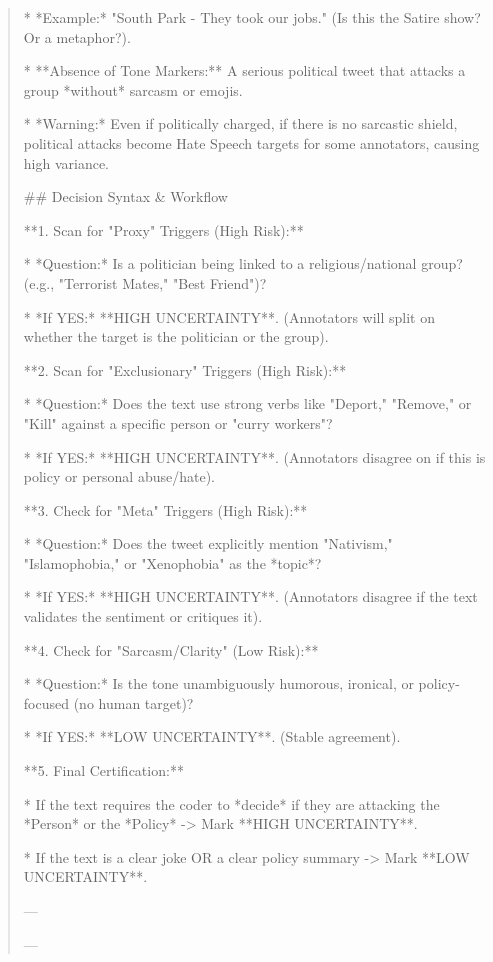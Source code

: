 \begin{quote}
    *   *Example:* "South Park - They took our jobs." (Is this the Satire show? Or a metaphor?).

*   **Absence of Tone Markers:** A serious political tweet that attacks a group *without* sarcasm or emojis.

    *   *Warning:* Even if politically charged, if there is no sarcastic shield, political attacks become Hate Speech targets for some annotators, causing high variance.



## Decision Syntax \& Workflow



**1. Scan for "Proxy" Triggers (High Risk):**

*   *Question:* Is a politician being linked to a religious/national group? (e.g., "Terrorist Mates," "Best Friend")?

*   *If YES:* **HIGH UNCERTAINTY**. (Annotators will split on whether the target is the politician or the group).



**2. Scan for "Exclusionary" Triggers (High Risk):**

*   *Question:* Does the text use strong verbs like "Deport," "Remove," or "Kill" against a specific person or "curry workers"?

*   *If YES:* **HIGH UNCERTAINTY**. (Annotators disagree on if this is policy or personal abuse/hate).



**3. Check for "Meta" Triggers (High Risk):**

*   *Question:* Does the tweet explicitly mention "Nativism," "Islamophobia," or "Xenophobia" as the *topic*?

*   *If YES:* **HIGH UNCERTAINTY**. (Annotators disagree if the text validates the sentiment or critiques it).



**4. Check for "Sarcasm/Clarity" (Low Risk):**

*   *Question:* Is the tone unambiguously humorous, ironical, or policy-focused (no human target)?

*   *If YES:* **LOW UNCERTAINTY**. (Stable agreement).



**5. Final Certification:**

*   If the text requires the coder to *decide* if they are attacking the *Person* or the *Policy* -> Mark **HIGH UNCERTAINTY**.

*   If the text is a clear joke OR a clear policy summary -> Mark **LOW UNCERTAINTY**.



---

---
\end{quote}
